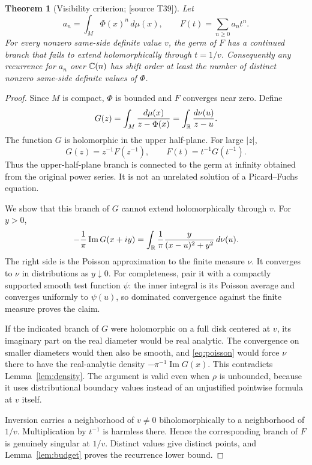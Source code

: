 \documentclass[11pt,a4paper]{article}
\newtheorem{theorem}{Theorem}[section]
\theoremstyle{definition}\newtheorem{definition}[theorem]{Definition}
\theoremstyle{remark}\newtheorem{remark}[theorem]{Remark}
\newcommand{\sourceT}[1]{\textup{[source T#1]}}
\begin{document}
\begin{theorem}[Visibility criterion; \sourceT{39}]\label{thm:visibility}
Let
\[
 a_n=\int_M\Phi(x)^n\,d\mu(x),\qquad
 F(t)=\sum_{n\ge0}a_nt^n.
\]
For every nonzero same-side definite value $v$, the germ of $F$ has a continued
branch that fails to extend holomorphically through $t=1/v$. Consequently any
recurrence for $a_n$ over $\mathbb C(n)$ has shift order at least the number of distinct
nonzero same-side definite values of $\Phi$.
\end{theorem}
\begin{proof}
Since $M$ is compact, $\Phi$ is bounded and $F$ converges near zero. Define
\begin{equation}\label{eq:cauchy}
 G(z)=\int_M\frac{d\mu(x)}{z-\Phi(x)}
     =\int_\mathbb R\frac{d\nu(u)}{z-u}.
\end{equation}
The function $G$ is holomorphic in the upper half-plane. For large $|z|$,
\[
 G(z)=z^{-1}F(z^{-1}),\qquad F(t)=t^{-1}G(t^{-1}).
\]
Thus the upper-half-plane branch is connected to the germ at infinity obtained
from the original power series. It is not an unrelated solution of a
Picard--Fuchs equation.

We show that this branch of $G$ cannot extend holomorphically through $v$.
For $y>0$,
\begin{equation}\label{eq:poisson}
 -\frac1\pi\operatorname{Im}G(x+iy)
   =\int_\mathbb R\frac{1}{\pi}\frac{y}{(x-u)^2+y^2}\,d\nu(u).
\end{equation}
The right side is the Poisson approximation to the finite measure $\nu$.
It converges to $\nu$ in distributions as $y\downarrow0$.
For completeness, pair it with a compactly supported smooth test function
$\psi$: the inner integral is its Poisson average and converges uniformly to
$\psi(u)$, so dominated convergence against the finite measure proves the claim.

If the indicated branch of $G$ were holomorphic on a full disk centered at $v$,
its imaginary part on the real diameter would be real analytic. The convergence
on smaller diameters would then also be smooth, and \eqref{eq:poisson} would
force $\nu$ there to have the real-analytic density
$-\pi^{-1}\operatorname{Im}G(x)$. This contradicts Lemma~\ref{lem:density}.
The argument is valid even when $\rho$ is unbounded, because it uses
distributional boundary values instead of an unjustified pointwise formula at
$v$ itself.

Inversion carries a neighborhood of $v\ne0$ biholomorphically to a neighborhood
of $1/v$. Multiplication by $t^{-1}$ is harmless there. Hence the corresponding
branch of $F$ is genuinely singular at $1/v$. Distinct values give distinct
points, and Lemma~\ref{lem:budget} proves the recurrence lower bound.
\end{proof}
\end{document}

